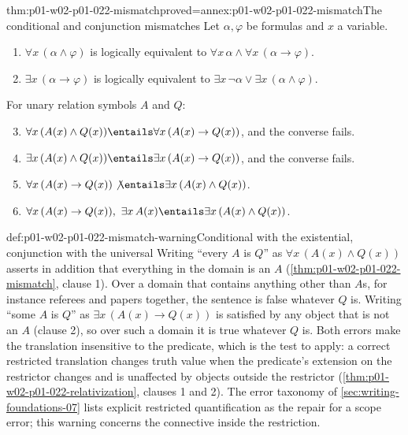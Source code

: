 \begin{hbtheorem}{thm:p01-w02-p01-022-mismatch}{proved=annex:p01-w02-p01-022-mismatch}{The conditional and conjunction mismatches}
Let \(\alpha,\varphi\) be formulas and \(x\) a variable.
\begin{enumerate}
  \item \(\forall x\,(\alpha\land\varphi)\) is logically equivalent to
        \(\forall x\,\alpha\land\forall x\,(\alpha\to\varphi)\).
  \item \(\exists x\,(\alpha\to\varphi)\) is logically equivalent to
        \(\exists x\,\neg\alpha\lor\exists x\,(\alpha\land\varphi)\).
\end{enumerate}
For unary relation symbols \(A\) and \(Q\):
\begin{enumerate}\setcounter{enumi}{2}
  \item \(\forall x\,(A(x)\land Q(x))\entails\forall x\,(A(x)\to Q(x))\),
        and the converse fails.
  \item \(\exists x\,(A(x)\land Q(x))\entails\exists x\,(A(x)\to Q(x))\),
        and the converse fails.
  \item \(\forall x\,(A(x)\to Q(x))\not\entails\exists x\,(A(x)\land Q(x))\).
  \item \(\forall x\,(A(x)\to Q(x)),\ \exists x\,A(x)\entails
        \exists x\,(A(x)\land Q(x))\).
\end{enumerate}
\end{hbtheorem}

\begin{hbwarning}{def:p01-w02-p01-022-mismatch-warning}{Conditional with the existential, conjunction with the universal}
Writing ``every \(A\) is \(Q\)'' as \(\forall x\,(A(x)\land Q(x))\) asserts in
addition that everything in the domain is an \(A\)
(\cref{thm:p01-w02-p01-022-mismatch}, clause 1). Over a domain that contains
anything other than \(A\)s, for instance referees and papers together, the
sentence is false whatever \(Q\) is. Writing ``some \(A\) is \(Q\)'' as
\(\exists x\,(A(x)\to Q(x))\) is satisfied by any object that is not an
\(A\) (clause 2), so over such a domain it is true whatever \(Q\) is. Both
errors make the translation insensitive to the predicate, which is the test
to apply: a correct restricted translation changes truth value when the
predicate's extension on the restrictor changes and is unaffected by objects
outside the restrictor (\cref{thm:p01-w02-p01-022-relativization}, clauses 1
and 2). The error taxonomy of \cref{sec:writing-foundations-07} lists
explicit restricted quantification as the repair for a scope error; this
warning concerns the connective inside the restriction.
\end{hbwarning}

